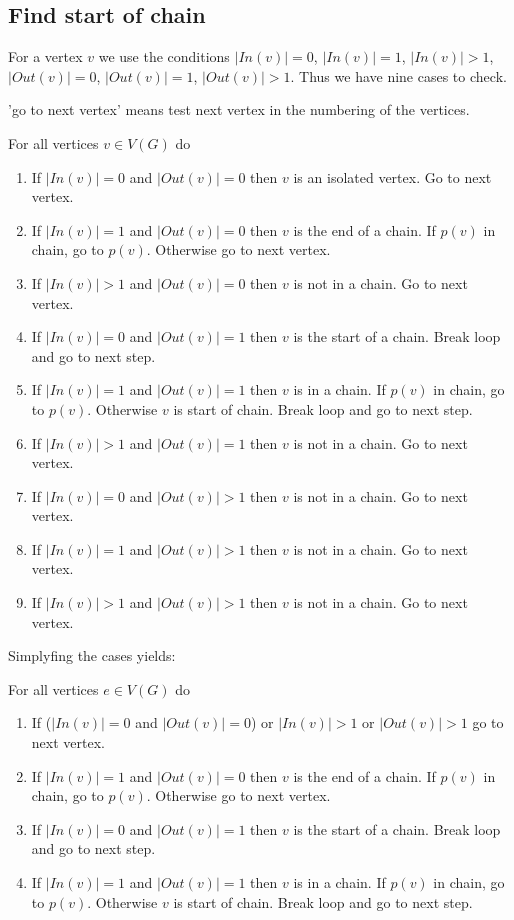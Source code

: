 \documentclass[12pt,a4paper]{report}
\begin{document}
\subsection{Find start of chain}
For a vertex $v$ we use the conditions $|In(v)| = 0$, $|In(v)| = 1$, $|In(v)| > 1$,
$|Out(v)| = 0$, $|Out(v)| = 1$, $|Out(v)| > 1$. Thus we have nine cases to check.

'go to next vertex' means test next vertex in the numbering of the vertices.

For all vertices $v \in V(G)$ do
\begin{enumerate}
\item If $|In(v)| = 0$ and $|Out(v)| = 0$ then $v$ is an isolated vertex. Go to next vertex.
\item If $|In(v)| = 1$ and $|Out(v)| = 0$ then $v$ is the end of a chain. If $p(v)$ in chain, go to $p(v)$. Otherwise go to next vertex.
\item If $|In(v)| > 1$ and $|Out(v)| = 0$ then $v$ is not in a chain. Go to next vertex.
\item If $|In(v)| = 0$ and $|Out(v)| = 1$ then $v$ is the start of a chain. Break loop and go to next step.
\item If $|In(v)| = 1$ and $|Out(v)| = 1$ then $v$ is in a chain. If $p(v)$ in chain, go to $p(v)$. Otherwise $v$ is start of chain. Break loop and go to next step.
\item If $|In(v)| > 1$ and $|Out(v)| = 1$ then $v$ is not in a chain. Go to next vertex.
\item If $|In(v)| = 0$ and $|Out(v)| > 1$ then $v$ is not in a chain. Go to next vertex.
\item If $|In(v)| = 1$ and $|Out(v)| > 1$ then $v$ is not in a chain. Go to next vertex.
\item If $|In(v)| > 1$ and $|Out(v)| > 1$ then $v$ is not in a chain. Go to next vertex.
\end{enumerate}
Simplyfing the cases yields:

For all vertices $e \in V(G)$ do
\begin{enumerate}
\item If ($|In(v)| = 0$ and $|Out(v)| = 0$) or $|In(v)| > 1$ or $|Out(v)| > 1$ go to next vertex.
\item If $|In(v)| = 1$ and $|Out(v)| = 0$ then $v$ is the end of a chain. If $p(v)$ in chain, go to $p(v)$. Otherwise go to next vertex.
\item If $|In(v)| = 0$ and $|Out(v)| = 1$ then $v$ is the start of a chain. Break loop and go to next step.
\item If $|In(v)| = 1$ and $|Out(v)| = 1$ then $v$ is in a chain. If $p(v)$ in chain, go to $p(v)$. Otherwise $v$ is start of chain. Break loop and go to next step.
\end{enumerate}
\end{document}
